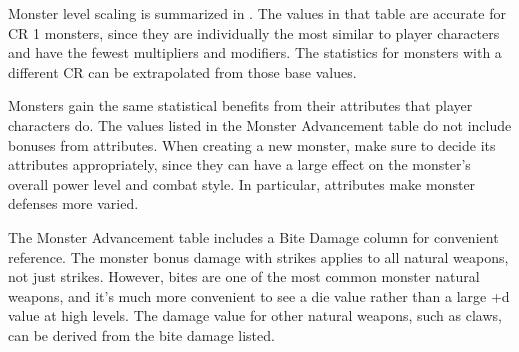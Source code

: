         Monster level scaling is summarized in .
        The values in that table are accurate for CR 1 monsters, since they are individually the most similar to player characters and have the fewest multipliers and modifiers.
        The statistics for monsters with a different CR can be extrapolated from those base values.

        Monsters gain the same statistical benefits from their attributes that player characters do.
        The values listed in the Monster Advancement table do not include bonuses from attributes.
        When creating a new monster, make sure to decide its attributes appropriately, since they can have a large effect on the monster's overall power level and combat style.
        In particular, attributes make monster defenses more varied.

        The Monster Advancement table includes a Bite Damage column for convenient reference.
        The monster bonus damage with strikes applies to all natural weapons, not just strikes.
        However, bites are one of the most common monster natural weapons, and it's much more convenient to see a die value rather than a large +d value at high levels.
        The damage value for other natural weapons, such as claws, can be derived from the bite damage listed.

